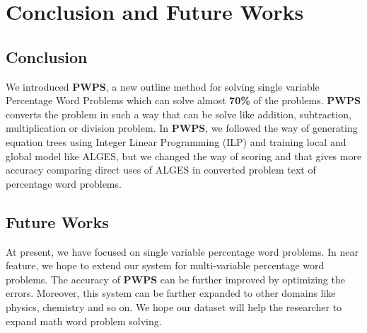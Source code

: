 \documentclass[document.tex]{subfiles}
\begin{document}
\chapter{Conclusion and Future Works}

\section{Conclusion}
We introduced \textbf{PWPS}, a new outline method for solving single variable Percentage Word Problems which can solve almost \textbf{70\%} of the problems. \textbf{PWPS} converts the problem in such a way that can be solve like addition, subtraction, multiplication or division problem. In \textbf{PWPS}, we followed the way of generating equation trees using Integer Linear Programming (ILP) and training local and global model like ALGES, but we changed the way of scoring and that gives more accuracy comparing direct uses of ALGES in converted problem text of percentage word problems.

\section{Future Works}

At present, we have focused on single variable percentage word problems. In near feature, we hope to extend our system for multi-variable percentage word problems. The accuracy of \textbf{PWPS} can be further improved by optimizing the errors. Moreover, this system can be farther expanded to other domains like physics, chemistry and so on. We hope our dataset will help the researcher to expand math word problem solving.
\end{document}
